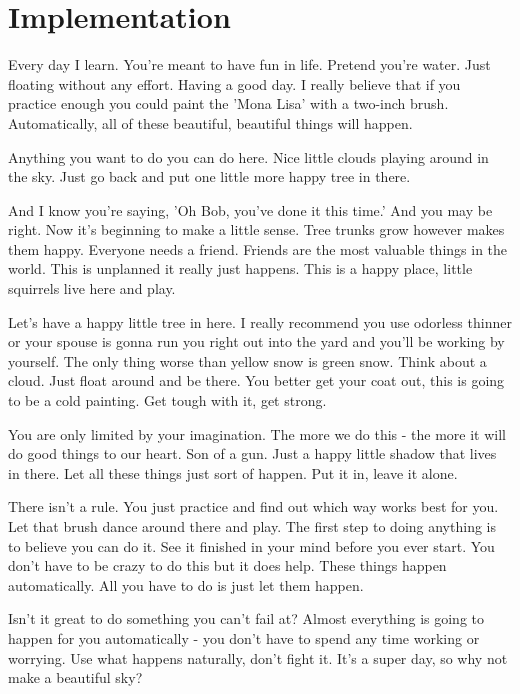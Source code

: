 \section{Implementation}
Every day I learn. You're meant to have fun in life. Pretend you're water. Just floating without any effort. Having a good day. I really believe that if you practice enough you could paint the 'Mona Lisa' with a two-inch brush. Automatically, all of these beautiful, beautiful things will happen.

Anything you want to do you can do here. Nice little clouds playing around in the sky. Just go back and put one little more happy tree in there.

And I know you're saying, 'Oh Bob, you've done it this time.' And you may be right. Now it's beginning to make a little sense. Tree trunks grow however makes them happy. Everyone needs a friend. Friends are the most valuable things in the world. This is unplanned it really just happens. This is a happy place, little squirrels live here and play.

Let's have a happy little tree in here. I really recommend you use odorless thinner or your spouse is gonna run you right out into the yard and you'll be working by yourself. The only thing worse than yellow snow is green snow. Think about a cloud. Just float around and be there. You better get your coat out, this is going to be a cold painting. Get tough with it, get strong.

You are only limited by your imagination. The more we do this - the more it will do good things to our heart. Son of a gun. Just a happy little shadow that lives in there. Let all these things just sort of happen. Put it in, leave it alone.

There isn't a rule. You just practice and find out which way works best for you. Let that brush dance around there and play. The first step to doing anything is to believe you can do it. See it finished in your mind before you ever start. You don't have to be crazy to do this but it does help. These things happen automatically. All you have to do is just let them happen.

Isn't it great to do something you can't fail at? Almost everything is going to happen for you automatically - you don't have to spend any time working or worrying. Use what happens naturally, don't fight it. It's a super day, so why not make a beautiful sky?

